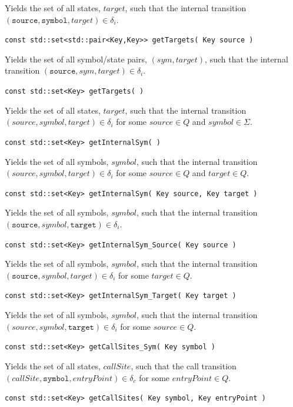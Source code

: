 \documentclass{llncs}
\begin{document}
\begin{description}
    Yields the set of all states, $target$, such that the internal transition $(\texttt{source},\texttt{symbol},target) \in \delta_i$.

  \item\texttt{const std::set<std::pair<Key,Key>> getTargets( Key source )}

    Yields the set of all symbol/state pairs, $(sym,target)$, such that the internal transition $(\texttt{source},sym,target) \in \delta_i$.

  \item\texttt{const std::set<Key> getTargets( )}

    Yields the set of all states, $target$, such that the internal transition $(source,symbol,target) \in \delta_i$ for some $source \in Q$ and $symbol \in \Sigma$.

  \item\texttt{const std::set<Key> getInternalSym( )}

    Yields the set of all symbols, $symbol$, such that the internal transition $(source,symbol,target) \in \delta_i$ for some $source \in Q$ and $target \in Q$.

  \item\texttt{const std::set<Key> getInternalSym( Key source, Key target )}

    Yields the set of all symbols, $symbol$, such that the internal transition $(\texttt{source},symbol,\texttt{target}) \in \delta_i$.

  \item\texttt{const std::set<Key> getInternalSym\_Source( Key source )}

    Yields the set of all symbols, $symbol$, such that the internal transition $(\texttt{source},symbol,target) \in \delta_i$ for some $target \in Q$.

  \item\texttt{const std::set<Key> getInternalSym\_Target( Key target )}

    Yields the set of all symbols, $symbol$, such that the internal transition $(source,symbol,\texttt{target}) \in \delta_i$ for some $source \in Q$.

  \item\texttt{const std::set<Key> getCallSites\_Sym( Key symbol )}

    Yields the set of all states, $callSite$, such that the call transition $(callSite,\texttt{symbol},entryPoint) \in \delta_c$ for some $entryPoint \in Q$.

  \item\texttt{const std::set<Key> getCallSites( Key symbol, Key entryPoint )}


\end{description}
\end{document}
